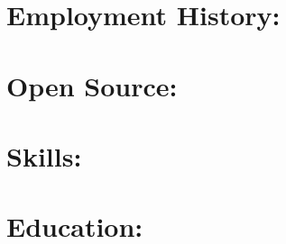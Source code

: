 \documentclass[8pt]{resume}
\begin{document}
\maketitle

\section{Employment History:}
    
    
    
    
    

    \section{Open Source:}
    
    
    
    
    
    
    

\section{Skills:}
\small

\normalsize

\section{Education:}

        
\end{document}
